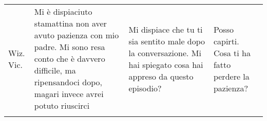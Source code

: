 \begin{table}[!htbp]
\begin{tabularx}{\linewidth}{l|X|X|X}
    \midrule
    Wiz. Vic. & Mi è dispiaciuto stamattina non aver avuto pazienza con mio padre. Mi sono resa conto che è davvero difficile, ma ripensandoci dopo, magari invece avrei potuto riuscirci & Mi dispiace che tu ti sia sentito male dopo la conversazione. Mi hai spiegato cosa hai appreso da questo episodio? & Posso capirti. Cosa ti ha fatto perdere la pazienza?\\
    \arrayrulecolor{black}
    \bottomrule
    \end{tabularx}
\end{table}
